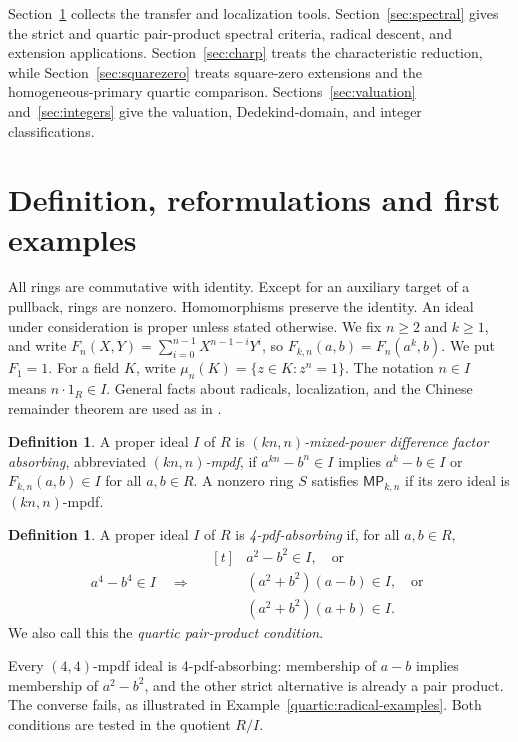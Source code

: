 \documentclass[11pt,a4paper]{amsart}
\theoremstyle{definition}
\newtheorem{definition}[theorem]{Definition}
\theoremstyle{remark}
\newcommand{\MP}[2]{\mathsf{MP}_{#1,#2}}
\numberwithin{equation}{section}
\begin{document}
Section~\ref{sec:prelim} collects the transfer and localization tools.
Section~\ref{sec:spectral} gives the strict and quartic pair-product
spectral criteria, radical descent, and extension applications.
Section~\ref{sec:charp} treats the characteristic reduction, while
Section~\ref{sec:squarezero} treats square-zero extensions and the
homogeneous-primary quartic comparison.
Sections~\ref{sec:valuation} and~\ref{sec:integers} give the valuation,
Dedekind-domain, and integer classifications.

\section{Definition, reformulations and first examples}\label{sec:prelim}

All rings are commutative with identity. Except for an auxiliary target
of a pullback, rings are nonzero. Homomorphisms preserve the identity.
An ideal under consideration is proper unless stated otherwise. We fix
$n\ge2$ and $k\ge1$, and write
$F_n(X,Y)=\sum_{i=0}^{n-1}X^{n-1-i}Y^i$, so
$F_{k,n}(a,b)=F_n(a^k,b)$. We put $F_1=1$. For a field $K$, write
$\mu_n(K)=\{z\in K:z^n=1\}$. The notation $n\in I$ means
$n\cdot1_R\in I$. General facts about radicals, localization, and the
Chinese remainder theorem are used as in \cite{AM}.

\begin{definition} \cite{TS}
A proper ideal $I$ of $R$ is \emph{$(kn,n)$-mixed-power difference factor
absorbing}, abbreviated \emph{$(kn,n)$-mpdf}, if
$a^{kn}-b^n\in I$ implies $a^k-b\in I$ or $F_{k,n}(a,b)\in I$ for all
$a,b\in R$. A nonzero ring $S$ satisfies $\MP{k}{n}$ if its zero ideal
is $(kn,n)$-mpdf.
\end{definition}

\begin{definition}\label{quartic:definition}
A proper ideal $I$ of $R$ is \emph{4-pdf-absorbing}
\cite[Definition~2.1]{TAHA} if, for all $a,b\in R$,
\[
 a^4-b^4\in I\quad\Longrightarrow\quad
 \begin{aligned}[t]
 &a^2-b^2\in I,\quad\text{or}\\
 &(a^2+b^2)(a-b)\in I,\quad\text{or}\\
 &(a^2+b^2)(a+b)\in I.
 \end{aligned}
\]
We also call this the \emph{quartic pair-product condition}.
\end{definition}

Every $(4,4)$-mpdf ideal is 4-pdf-absorbing: membership of $a-b$
implies membership of $a^2-b^2$, and the other strict alternative
is already a pair product. The converse fails, as illustrated in
Example~\ref{quartic:radical-examples}. Both conditions are tested
in the quotient $R/I$.
\end{document}
